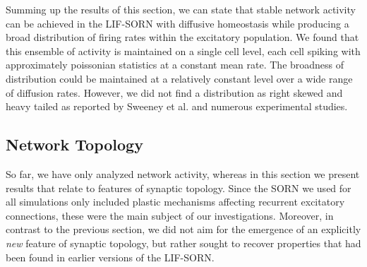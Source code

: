 \documentclass[10pt,a4paper]{article}
\begin{document}
Summing up the results of this section, we can state that stable network activity can be achieved in the LIF-SORN with diffusive homeostasis while producing a broad distribution of firing rates within the excitatory population. We found that this ensemble of activity is maintained on a single cell level, each cell spiking with approximately poissonian statistics at a constant mean rate. The broadness of distribution could be maintained at a relatively constant level over a wide range of diffusion rates. However, we did not find a distribution as right skewed and heavy tailed as reported by Sweeney et al. and numerous experimental studies.

\subsection{Network Topology}
So far, we have only analyzed network activity, whereas in this section we present results that relate to features of synaptic topology. Since the SORN we used for all simulations only included plastic mechanisms affecting recurrent excitatory connections, these were the main subject of our investigations. Moreover, in contrast to the previous section, we did not aim for the emergence of an explicitly \emph{new} feature of synaptic topology, but rather sought to recover properties that had been found in earlier versions of the LIF-SORN.
\end{document}
